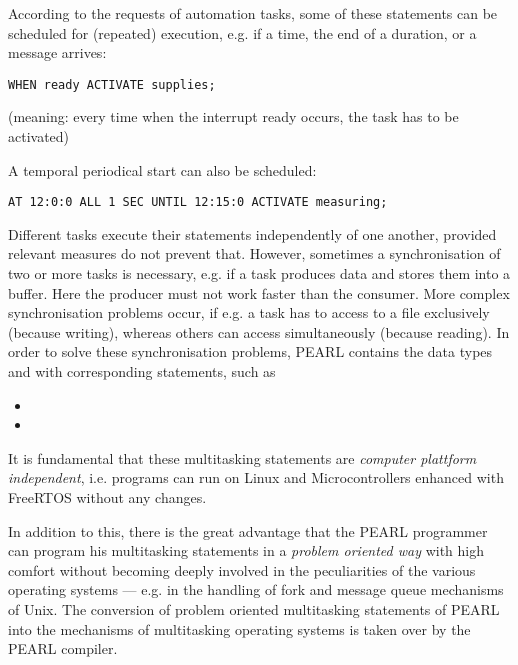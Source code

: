 According to the requests of automation tasks, some of these
statements can be scheduled for (repeated) execution, e.g. if a time,
the end of a duration, or a message arrives:

\begin{lstlisting}[frame=off]
WHEN ready ACTIVATE supplies;
\end{lstlisting}
(meaning: every time when the interrupt ready occurs, the task 
has to be activated)

A temporal periodical start can also be scheduled:
\begin{lstlisting}[frame=off]
AT 12:0:0 ALL 1 SEC UNTIL 12:15:0 ACTIVATE measuring;
\end{lstlisting}

Different tasks execute their statements independently of one another,
provided relevant measures do not prevent that. However, sometimes a
synchronisation of two or more tasks is necessary, e.g. if a task
produces data and stores them into a buffer. Here the producer must not
work faster than the consumer. More complex synchronisation problems
occur, if e.g. a task has to access to a file exclusively (because
writing), whereas others can access simultaneously (because reading). In
order to solve these synchronisation problems, PEARL contains the data
types  and  
with corresponding statements, such as

\begin{itemize}
\item {}        %
\item {} %
\end{itemize}


It is fundamental that these multitasking statements are {\it computer 
plattform independent}, i.e. \OpenPEARL{} programs can run on Linux and 
Microcontrollers enhanced with FreeRTOS without any changes.

In addition to this, there is the great advantage that the PEARL
programmer can program his multitasking statements in a {\it problem
oriented way} with high comfort without becoming deeply involved in the
peculiarities of the various operating systems --- e.g. in the handling
of fork and message queue mechanisms of Unix. The conversion of problem
oriented multitasking statements of PEARL into the mechanisms of
multitasking operating systems is taken over by the PEARL compiler.

